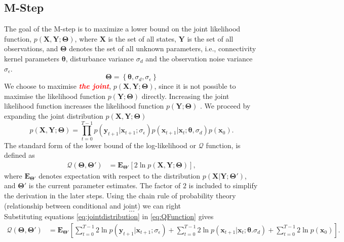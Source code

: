 \documentclass[]{article}
\newcommand{\dean}[1]{\textsf{\emph{\textbf{\textcolor{red}{#1}}}}}
\begin{document}
\subsection{M-Step}
The goal of the M-step is to maximize a lower bound on the joint likelihood function, $p(\mathbf X,\mathbf Y;\boldsymbol \Theta)$, where $\mathbf X$ is the set of all states, $\mathbf Y$ is the set of all observations, and $\boldsymbol \Theta$ denotes the set of all unknown parameters, i.e., connectivity kernel parameters $\boldsymbol\theta$, disturbance variance $\sigma_d$ and the observation noise variance $\sigma_{\epsilon}$.
\begin{equation}
	\boldsymbol\Theta = \left\lbrace \boldsymbol\theta, \sigma_d, \sigma_{\epsilon}\right\rbrace 
\end{equation} We choose to maximise \dean{the joint}, $p(\mathbf X,\mathbf Y;\boldsymbol \Theta)$, since it is not  possible to maximise the likelihood function $p(\mathbf Y;\boldsymbol\Theta)$ directly. Increasing the joint likelihood function increases the likelihood function $p(\mathbf Y;\boldsymbol \Theta)$ \cite{McLachlan1997}. We proceed by expanding the joint distribution $p(\mathbf X,\mathbf Y;\boldsymbol \Theta)$
\begin{equation}\label{eq:jointdistribution}
 p(\mathbf X,\mathbf Y;\boldsymbol \Theta)=\prod_{t=0}^{T-1} p(\mathbf y_{t+1}|\mathbf x_{t+1}; \sigma_{\epsilon})p(\mathbf x_{t+1}|\mathbf x_{t};\boldsymbol \theta, \sigma_d)p(\mathbf x_0).
\end{equation}
The standard form of the lower bound of the log-likelihood or $\mathcal{Q}$ function, is defined as   
\begin{align}\label{eq:QFunction}
 \mathcal Q(\boldsymbol \Theta,\boldsymbol\Theta')&=\mathbf E_{\boldsymbol \Theta'}\left[2\ln p(\mathbf X,\mathbf Y;\boldsymbol \Theta)\right],
\end{align}
where $ \mathbf E_{\boldsymbol \Theta'}$ denotes expectation with respect to the distribution $p(\mathbf X | \mathbf Y;\boldsymbol \Theta')$, and $\boldsymbol \Theta'$ is the current parameter estimates. The factor of $2$ is included to simplify the derivation in the later steps. Using the chain rule of probability theory (relationship between conditional and joint) we can right
\begin{equation}
	... \nonumber
\end{equation}
 Substituting equations \ref{eq:jointdistribution} in \ref{eq:QFunction} gives
\begin{align}
 \mathcal Q(\boldsymbol \Theta,\boldsymbol\Theta')&=\mathbf E_{\boldsymbol\Theta'}\left[\sum_{t=0}^{T-1}2\ln p(\mathbf y_{t+1}|\mathbf x_{t+1};\sigma_{\epsilon})+\sum_{t=0}^{T-1}2\ln p(\mathbf x_{t+1}|\mathbf x_{t};\boldsymbol \theta. \sigma_d)+\sum_{t=0}^{T-1}2\ln p(\mathbf x_0)\right].
\end{align}
\end{document}
